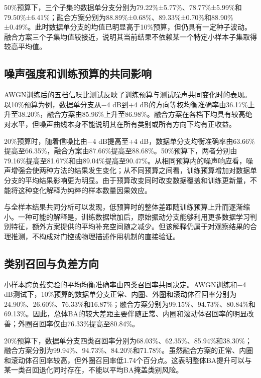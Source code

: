 \documentclass[UTF8,12pt,openany,twoside]{ctexbook}
\numberwithin{equation}{chapter}
\begin{document}
50\%预算下，三个子集的数据单分支分别为79.22\%±5.77\%、78.77\%±5.99\%和79.50\%±6.41\%；融合方案分别为88.89\%±0.68\%、89.33\%±0.70\%和88.90\%±0.49\%。此时数据单分支的均值已明显高于10\%预算，但仍具有一定种子波动。融合方案三个子集均值较接近，说明其当前结果不依赖某一个特定小样本子集取得较高平均值。

\subsection{噪声强度和训练预算的共同影响}\label{ux566aux58f0ux5f3aux5ea6ux548cux8badux7ec3ux9884ux7b97ux7684ux5171ux540cux5f71ux54cd}

AWGN训练后的五档信噪比测试反映了训练预算与测试噪声共同变化时的表现。以10\%预算为例，数据单分支从−4 dB到+4 dB的方向等权均衡准确率由36.17\%上升至38.20\%，融合方案由85.96\%上升至86.98\%。融合方案在各档下均具有较高绝对水平，但噪声曲线本身不能说明其在所有类别或所有方向下均有正收益。

20\%预算时，随着信噪比由−4 dB提高至+4 dB，数据单分支均衡准确率由63.66\%提高至66.35\%，融合方案由87.66\%提高至88.68\%。50\%预算下，两者分别由79.16\%提高至81.67\%和由89.04\%提高至90.47\%。从相同预算内的噪声响应看，噪声增强会使两种方法的结果发生变化；从不同预算之间看，训练预算增加对数据单分支的平均结果影响更为明显。由于预算改变同时改变数据覆盖和训练更新量，不能将这种变化解释为纯粹的样本数量因果效应。

与全样本结果共同分析可以发现，低预算时的整体差距随训练预算上升而逐渐缩小。一种可能的解释是，训练数据增加后，原始振动分支能够利用更多数据学习判别特征，额外方案提供的平均补充空间随之减少。但该解释仍属于对观察结果的合理推测，不构成对门控或物理描述作用机制的直接验证。

\subsection{类别召回与负差方向}\label{ux7c7bux522bux53ecux56deux4e0eux8d1fux5deeux65b9ux5411}

小样本跨负载实验的平均均衡准确率由四类召回率共同决定。AWGN训练和−4 dB测试下，10\%预算的数据单分支正常、内圈、外圈和滚动体召回率分别为24.90\%、26.60\%、76.33\%和16.87\%；融合方案分别为99.15\%、94.73\%、80.84\%和69.13\%。因此，总体BA的较大差距主要伴随正常、内圈和滚动体召回率的明显改善；外圈召回率仅由76.33\%提高至80.84\%。

20\%预算下，数据单分支四类召回率分别为68.03\%、62.35\%、85.94\%和38.30\%；融合方案分别为99.94\%、94.73\%、84.20\%和71.78\%。虽然融合方案的正常、内圈和滚动体召回率较高，但外圈召回率低1.74个百分点。这表明整体BA提升可以与某一类召回退化同时存在，不能以平均BA掩盖类别风险。
\end{document}

